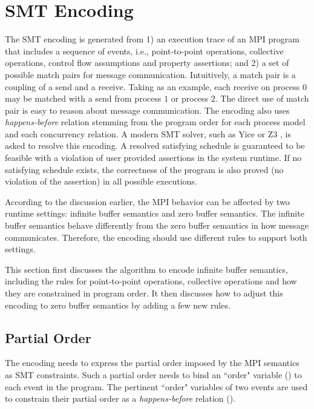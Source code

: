 \section{SMT Encoding}
The SMT encoding is generated from 1) an execution trace of an MPI program that includes a sequence of events, i.e., point-to-point operations, collective operations, control flow assumptions and property assertions; and 2) a set of possible match pairs for message communication. Intuitively, a match pair is a coupling of a send and a receive. Taking  as an example, each receive on process $0$ may be matched with a send from process $1$ or process $2$. The direct use of match pair is easy to reason about message communication. The encoding also uses \textit{happens-before} relation stemming from the program order for each process model and each concurrency relation. A modern SMT solver, such as Yice \cite{dutertre:CAV06} or Z3 \cite{demoura:tacas08}, is asked to resolve this encoding. A resolved satisfying schedule is guaranteed to be feasible with a violation of user provided assertions in the system runtime. If no satisfying schedule exists, the correctness of the program is also proved (no violation of the assertion) in all possible executions. 

According to the discussion earlier, the MPI behavior can be affected by two runtime settings: infinite buffer semantics and zero buffer semantics. The infinite buffer semantics behave differently from the zero buffer semantics in how message communicates. Therefore, the encoding should use different rules to support both settings. 

This section first discusses the algorithm to encode infinite buffer semantics, including the rules for point-to-point operations, collective operations and how they are constrained in program order. It then discusses how to adjust this encoding to zero buffer semantics by adding a few new rules.

\subsection{Partial Order}
The encoding needs to express the partial order imposed by the MPI semantics as SMT constraints. Such a partial order needs to bind an ``order" variable () to each event in the program. The pertinent ``order" variables of two events are used to constrain their partial order as a \emph{happens-before} relation ().

